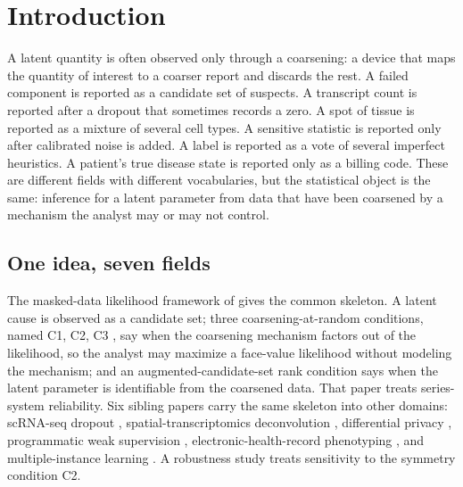 \section{Introduction}
\label{sec:intro}

A latent quantity is often observed only through a coarsening: a
device that maps the quantity of interest to a coarser report and
discards the rest. A failed component is reported as a candidate set
of suspects. A transcript count is reported after a dropout that
sometimes records a zero. A spot of tissue is reported as a mixture of
several cell types. A sensitive statistic is reported only after
calibrated noise is added. A label is reported as a vote of several
imperfect heuristics. A patient's true disease state is reported only
as a billing code. These are different fields with different
vocabularies, but the statistical object is the same: inference for a
latent parameter from data that have been coarsened by a mechanism the
analyst may or may not control.

\subsection{One idea, seven fields}

The masked-data likelihood framework of \citet{towell2026masked} gives
the common skeleton. A latent cause is observed as a candidate set;
three coarsening-at-random conditions, named C1, C2, C3
\citep{heitjan1991ignorability,gill1997coarsening,little2002statistical},
say when the coarsening mechanism factors out of the likelihood, so
the analyst may maximize a face-value likelihood without modeling the
mechanism; and an augmented-candidate-set rank condition says when the
latent parameter is identifiable from the coarsened data. That paper
treats series-system reliability. Six sibling papers carry the same
skeleton into other domains: scRNA-seq dropout
\citep{towell2026scrnacoarsening}, spatial-transcriptomics
deconvolution \citep{towell2026spatialcoarsening}, differential
privacy \citep{towell2026dpcoarsening}, programmatic weak supervision
\citep{towell2026weaksupcoarsening}, electronic-health-record
phenotyping \citep{towell2026phenotypecoarsening}, and multiple-instance
learning \citep{towell2026milcoarsening}. A robustness study
\citep{towell2026mdrelax} treats sensitivity to the symmetry condition
C2.

